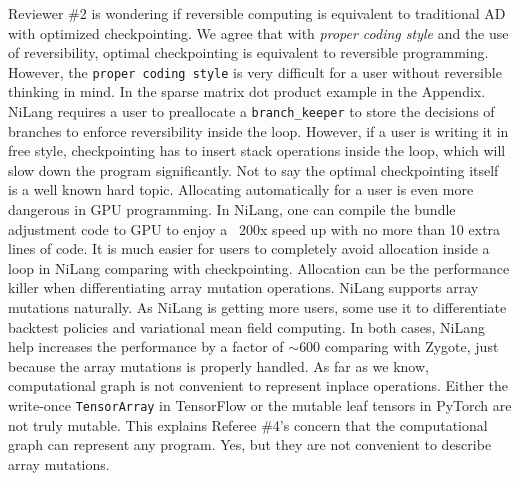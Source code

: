 \documentclass{article}
\begin{document}
Reviewer \#2 is wondering if reversible computing is equivalent to traditional AD with optimized checkpointing.
We agree that with \textit{proper coding style} and the use of reversibility, optimal checkpointing is equivalent to reversible programming.
However, the \texttt{proper coding style} is very difficult for a user without reversible thinking in mind.
In the sparse matrix dot product example in the Appendix.
NiLang requires a user to preallocate a \texttt{branch\_keeper} to store the decisions of branches to enforce reversibility inside the loop.
However, if a user is writing it in free style, checkpointing has to insert stack operations inside the loop, which will slow down the program significantly.
Not to say the optimal checkpointing itself is a well known hard topic.
Allocating automatically for a user is even more dangerous in GPU programming.
In NiLang, one can compile the bundle adjustment code to GPU to enjoy a ~200x speed up with no more than 10 extra lines of code.
It is much easier for users to completely avoid allocation inside a loop in NiLang comparing with checkpointing.
Allocation can be the performance killer when differentiating array mutation operations.
NiLang supports array mutations naturally. As NiLang is getting more users, some use it to differentiate backtest policies and variational mean field computing. In both cases, NiLang help increases the performance by a factor of $\sim600$ comparing with Zygote, just because the array mutations is properly handled.
As far as we know, computational graph is not convenient to represent inplace operations.
Either the write-once \texttt{TensorArray} in TensorFlow or the mutable leaf tensors in PyTorch are not truly mutable.
This explains Referee \#4's concern that the computational graph can represent any program.
Yes, but they are not convenient to describe array mutations.

\end{document}
